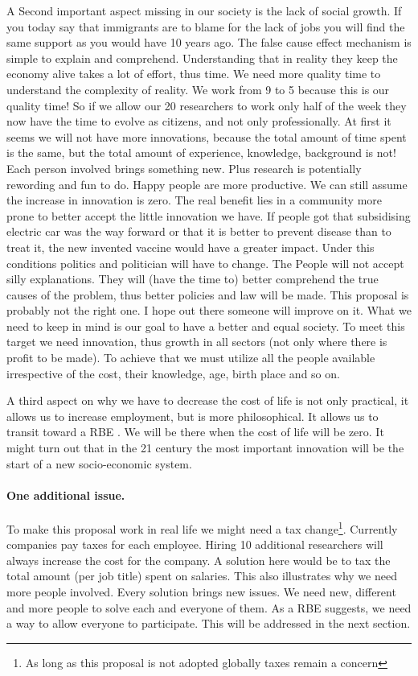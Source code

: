 \documentclass{article}
\begin{document}
A Second important aspect missing in our society is the lack of social growth.
If you today say that immigrants are to blame for the lack of jobs you will find the same support as you would have 10 years ago.
The false cause effect mechanism is simple to explain and comprehend.
Understanding that in reality they keep the economy alive takes a lot of effort, thus time.
We need more quality time to understand the complexity of reality.
We work from 9 to 5 because this is our quality time!
So if we allow our 20 researchers to work only half of the week they now have the time to evolve as citizens, and not only professionally.
At first it seems we will not have more innovations, because the total amount of time spent is the same, but the total amount of experience, knowledge, background is not!
Each person involved brings something new.
Plus research is potentially rewording and fun to do.
Happy people are more productive.
We can still assume the increase in innovation is zero.
The real benefit lies in a community more prone to better accept the little innovation we have.
If people got that subsidising electric car was the way forward or that it is better to prevent disease than to treat it, the new invented vaccine would have a greater impact.
Under this conditions politics and politician will have to change.
The People will not accept silly explanations.
They will (have the time to) better comprehend the true causes of the problem, thus better policies and law will be made.
This proposal is probably not the right one.
I hope out there someone will improve on it.
What we need to keep in mind is our goal to have a better and equal society.
To meet this target we need innovation, thus growth in all sectors (not only where there is profit to be made).
To achieve that we must utilize all the people available irrespective of the cost, their knowledge, age, birth place and so on.

A third aspect on why we have to decrease the cost of life is not only practical, it allows us to increase employment, but is more philosophical.
It allows us to transit toward a RBE \cite{rbe}.
We will be there when the cost of life will be zero.
It might turn out that in the 21 century the most important innovation will be the start of a new socio-economic system.

\paragraph{One additional issue.}
To make this proposal work in real life we might need a tax change\footnote{As long as this proposal is not adopted globally taxes remain a concern}.
Currently companies pay taxes for each employee.
Hiring 10 additional researchers will always increase the cost for the company.
A solution here would be to tax the total amount (per job title) spent on salaries.
This also illustrates why we need more people involved.
Every solution brings new issues.
We need new, different and more people to solve each and everyone of them.
As a RBE suggests, we need a way to allow everyone to participate.
This will be addressed in the next section.
\newpage


\end{document}
